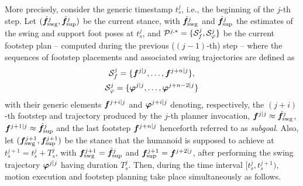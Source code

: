 More precisely, consider the generic timestamp $t_s^j$, i.e., the beginning of the $j$-th step.
Let $(\hat{{\bm{f}}}_{\rm swg}^{j}, \hat{{\bm{f}}}_{\rm sup}^{j})$ be the current stance, with $\hat{{\bm{f}}}_{\rm swg}^{j}$ and $\hat{{\bm{f}}}_{\rm sup}^{j}$ the estimates of the swing and support foot poses at $t_s^j$, and ${\cal P}^{j,*} = \{ {\cal S}_f^{j}, {\cal S}_\varphi^{j} \}$ be the current footstep plan -- computed during the previous ($(j-1)$-th) step -- where the sequences of footstep placements and associated swing trajectories are defined as
\begin{gather*}
    {\cal S}_f^j = \{{\bm{f}}^{j|j}, \dots, {\bm{f}}^{j+n|j}\}, \\
    {\cal S}_\varphi^j = \{{\bm{\varphi}}^{j|j}, \dots, {\bm{\varphi}}^{j+n-2|j}\}
\end{gather*}
with their generic elements ${\bm{f}}^{j+i|j}$ and ${\bm{\varphi}}^{j+i|j}$ denoting, respectively, the $(j+i)$-th footstep and trajectory produced by the $j$-th planner invocation, ${\bm{f}}^{j|j} \approx \hat{{\bm{f}}}_{\rm swg}^{j}$, ${\bm{f}}^{j+1|j} \approx \hat{{\bm{f}}}_{\rm sup}^{j}$ and the last footstep ${\bm{f}}^{j+n|j}$ henceforth referred to as \textit{subgoal}.
Also, let $({\bm{f}}_{\rm swg}^{j+1}, {\bm{f}}_{\rm sup}^{j+1})$ be the stance that the humanoid is supposed to achieve at $t_s^{j+1} = t_s^j + T_s^j$, with ${\bm{f}}_{\rm swg}^{j+1} = \hat{{\bm{f}}}_{\rm sup}^{j}$ and ${\bm{f}}_{\rm sup}^{j+1} = {\bm{f}}^{j+2|j}$, after performing the swing trajectory ${\bm{\varphi}}^{j|j}$ having duration $T_s^j$.
%
Then, during the time interval $[t_s^j, t_s^{j+1})$, motion execution and footstep planning take place simultaneously as follows.
